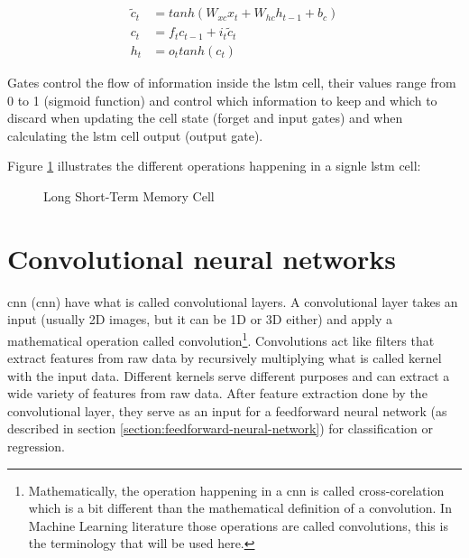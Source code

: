 \begin{align}
    \tilde{c}_t &= tanh(W_{xc}x_t+W_{hc}h_{t-1}+b_c) \label{equation:lstm_candidate_cell_state} \\
    c_t &= f_tc_{t-1}+i_t\tilde{c}_t \label{equation:lstm_cell_state}\\
    h_t &= o_ttanh(c_t) \label{equation:lstm_hidden_state}
\end{align}

Gates control the flow of information inside the \acrshort{lstm} cell, their values range from 0 to 1 (sigmoid function) and control which information to keep and which to discard when updating the cell state (forget and input gates) and when calculating the \acrshort{lstm} cell output (output gate).

Figure \ref{fig:lstm} illustrates the different operations happening in a signle \acrshort{lstm} cell:

\begin{figure}[h]
    \centering
    
    \caption{Long Short-Term Memory Cell}
    \label{fig:lstm}
\end{figure}

\section{Convolutional neural networks}
\label{section:cnn}
\acrlong{cnn} (\acrshort{cnn}) have what is called convolutional layers. A convolutional layer takes an input (usually 2D images, but it can be 1D or 3D either) and apply a mathematical operation called convolution\footnote{Mathematically, the operation happening in a \acrshort{cnn} is called cross-corelation which is a bit different than the mathematical definition of a convolution. In Machine Learning literature those operations are called convolutions, this is the terminology that will be used here.}. Convolutions act like filters that extract features from raw data by recursively multiplying what is called kernel with the input data. Different kernels serve different purposes and can extract a wide variety of features from raw data. After feature extraction done by the convolutional layer, they serve as an input for a feedforward neural network (as described in section \ref{section:feedforward-neural-network}) for classification or regression.


